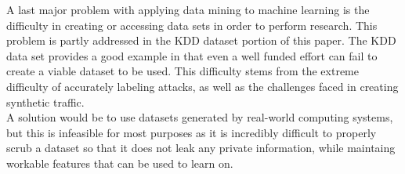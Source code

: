 \documentclass[12pt]{article} %
\begin{document}
A last major problem with applying data mining to machine learning is the difficulty in creating or accessing data sets in order to perform research. This problem is partly addressed in the KDD dataset portion of this paper. The KDD data set provides a good example in that even a well funded effort can fail to create a viable dataset to be used. This difficulty stems from the extreme difficulty of accurately labeling attacks, as well as the challenges faced in creating synthetic traffic.\\
A solution would be to use datasets generated by real-world computing systems, but this is infeasible for most purposes as it is incredibly difficult to properly scrub a dataset so that it does not leak any private information, while maintaing workable features that can be used to learn on.\\

\pagebreak
\end{document}

